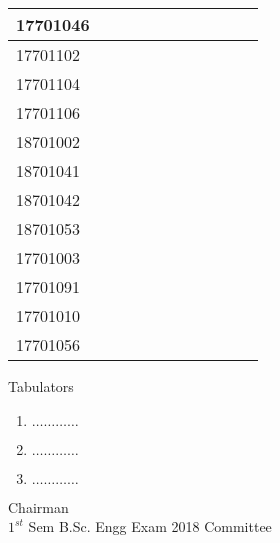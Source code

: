 \documentclass[12pt]{article}
\begin{document}
\begin{center}
\begin{small}
\begin{tabular}{|l|c|c|c|c|c|c|c|c|c|c|}
17701046 &  &  &  &  &  &  &  &  & \\ \hline 
17701102 &  &  &  &  &  &  &  &  & \\ \hline 
17701104 &  &  &  &  &  &  &  &  & \\ \hline 
17701106 &  &  &  &  &  &  &  &  & \\ \hline 
18701002 &  &  &  &  &  &  &  &  & \\ \hline 
18701041 &  &  &  &  &  &  &  &  & \\ \hline 
18701042 &  &  &  &  &  &  &  &  & \\ \hline 
18701053 &  &  &  &  &  &  &  &  & \\ \hline 
17701003 &  &  &  &  &  &  &  &  & \\ \hline 
17701091 &  &  &  &  &  &  &  &  & \\ \hline 
17701010 &  &  &  &  &  &  &  &  & \\ \hline 
17701056 &  &  &  &  &  &  &  &  & \\ \hline 
        \end{tabular}
            \end{small}
            \end{center}
  \centering
            
            \begin{table}[hb]
            	\centering
            \begin{minipage}[b]{0.5\linewidth} %
            {\centering Tabulators }
            \begin{enumerate}
                \item  \hspace*{1ex} $\ldots \ldots \ldots \ldots$  
                \item  \hspace*{1ex} $\ldots \ldots \ldots \ldots$  
                \item  \hspace*{1ex} $\ldots \ldots \ldots \ldots$  
            \end{enumerate} 

            \end{minipage}
            \hspace*{1.2cm}
            \begin{minipage}[b]{0.4\linewidth} \centering
            Chairman  \hspace*{1ex} \\
           $1^{st}$ Sem B.Sc. Engg Exam 2018 Committee
            \end{minipage}
            \end{table}
            \clearpage
            
\end{document}
